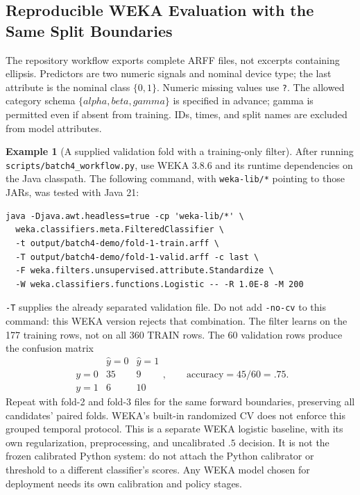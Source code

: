 \documentclass[11pt,twoside]{article}
\numberwithin{equation}{section}
\theoremstyle{plain}
\theoremstyle{definition}
\newtheorem{example}[theorem]{Example}
\theoremstyle{remark}
\begin{document}
\subsection{Reproducible WEKA Evaluation with the Same Split Boundaries}
\label{sec:weka-forward}
The repository workflow exports complete ARFF files, not excerpts containing
ellipsis. Predictors are two numeric signals and nominal device type; the
last attribute is the nominal class $\{0,1\}$. Numeric missing values use
\texttt{?}. The allowed category schema $\{alpha,beta,gamma\}$ is specified
in advance; gamma is permitted even if absent from training. IDs, times, and
split names are excluded from model attributes.

\begin{example}[A supplied validation fold with a training-only filter]
After running \texttt{scripts/batch4\_workflow.py}, use WEKA 3.8.6 and its
runtime dependencies on the Java classpath. The following command, with
\texttt{weka-lib/*} pointing to those JARs, was tested with Java 21:
\begin{lstlisting}[basicstyle=\ttfamily\footnotesize]
java -Djava.awt.headless=true -cp 'weka-lib/*' \
  weka.classifiers.meta.FilteredClassifier \
  -t output/batch4-demo/fold-1-train.arff \
  -T output/batch4-demo/fold-1-valid.arff -c last \
  -F weka.filters.unsupervised.attribute.Standardize \
  -W weka.classifiers.functions.Logistic -- -R 1.0E-8 -M 200
\end{lstlisting}
\texttt{-T} supplies the already separated validation file. Do not add
\texttt{-no-cv} to this command: this WEKA version rejects that combination.
The filter learns on the 177 training rows, not on all 360 TRAIN rows.
The 60 validation rows produce the confusion matrix
\[
\begin{array}{c|rr}
 &\hat y=0&\hat y=1\\\hline
y=0&35&9\\y=1&6&10
\end{array},\qquad \mathrm{accuracy}=45/60=.75.
\]
Repeat with fold-2 and fold-3 files for the same forward boundaries, preserving
all candidates' paired folds. WEKA's built-in randomized CV does not enforce
this grouped temporal protocol. This is a separate WEKA logistic baseline,
with its own regularization, preprocessing, and uncalibrated $.5$ decision.
It is not the frozen calibrated Python system: do not attach the Python
calibrator or threshold to a different classifier's scores. Any WEKA model
chosen for deployment needs its own calibration and policy stages.
\end{example}
\end{document}
